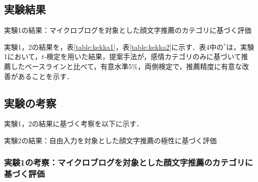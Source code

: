 \documentclass[japanese]{jnlp_1.4}
\begin{document}
\subsection{実験結果}

\begin{table}[b]
\caption{実験1の結果：マイクロブログを対象とした顔文字推薦のカテゴリに基づく評価}
\label{table:kekka1}

\end{table}

実験1，2の結果を，表\ref{table:kekka1}，表\ref{table:kekka2}に示す．表4中の$^{*}$は，実験1において，$t$-検定を用いた結果，提案手法が，感情カテゴリのみに基づいて推薦したベースラインと比べて，有意水準5\%，両側検定で，推薦精度に有意な改善があることを示す．



\subsection{実験の考察}

実験1，2の結果に基づく考察を以下に示す．

\begin{table}[t]
\caption{実験2の結果：自由入力を対象とした顔文字推薦の極性に基づく評価}
\label{table:kekka2}

\end{table}

\subsubsection*{実験1の考察：マイクロブログを対象とした顔文字推薦のカテゴリに基づく評価}
\end{document}
